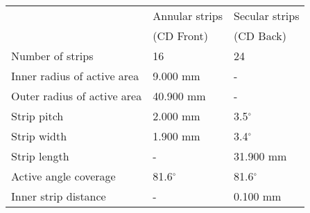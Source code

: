 \begin{tabular}{lll}
\hline
                            & Annular strips & Secular strips \\
                            & (CD Front)     & (CD Back)      \\
\hline
Number of strips            & 16             & 24             \\
Inner radius of active area &  9.000 mm      & -              \\
Outer radius of active area & 40.900 mm      & -              \\
Strip pitch                 &  2.000 mm      & 3.5$^\circ$    \\
Strip width                 &  1.900 mm      & 3.4$^\circ$    \\
Strip length                &  -             & 31.900 mm      \\
Active angle coverage       & 81.6$^\circ$   & 81.6$^\circ$   \\
Inner strip distance        &  -             & 0.100 mm       \\
\hline
\end{tabular}